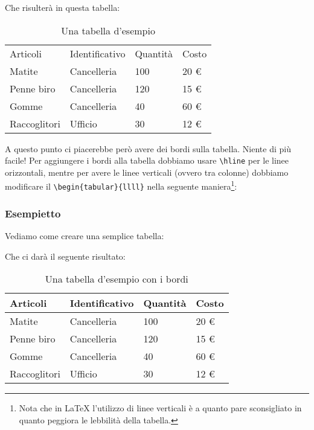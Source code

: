 Che risulterà in questa tabella:
\begin{table}[H]
\centering
\begin{tabular}{llll}
Articoli      & Identificativo & Quantità & Costo \\
Matite        & Cancelleria    & 100      & 20 \euro{}\\
Penne biro    & Cancelleria    & 120      & 15 \euro{}\\
Gomme         & Cancelleria    & 40       & 60 \euro{}\\
Raccoglitori  & Ufficio        & 30       & 12 \euro{}
\end{tabular}
\caption{Una tabella d'esempio}
\label{tabella:esempio}
\end{table}

A questo punto ci piacerebbe però avere dei bordi sulla tabella. Niente di più
facile! Per aggiungere i bordi alla tabella dobbiamo usare \verb!\hline! per le
linee orizzontali, mentre per avere le linee verticali (ovvero tra colonne)
dobbiamo modificare il \verb!\begin{tabular}{llll}! nella seguente
maniera\footnote{Nota che in \LaTeX{} l'utilizzo di linee verticali è a
quanto pare sconsigliato in quanto peggiora le lebbilità della tabella.}:

\vspace{\abovedisplayskip}
\begin{minipage}{\linewidth}
  \subsubsection{Esempietto}

  Vediamo come creare una semplice tabella:
  


\end{minipage}
\vspace{\belowdisplayskip}

Che ci darà il seguente risultato:

\begin{table}[H]
\centering
\begin{tabular}{|l|l|l|l|}
\hline
Articoli      & Identificativo & Quantità & Costo \\
\hline
Matite        & Cancelleria    & 100      & 20 \euro{}\\
\hline
Penne biro    & Cancelleria    & 120      & 15 \euro{}\\
\hline
Gomme         & Cancelleria    & 40       & 60 \euro{}\\
\hline
Raccoglitori  & Ufficio        & 30       & 12 \euro{}\\
\hline
\end{tabular}
\caption{Una tabella d'esempio con i bordi}
\label{tabella:esempio2}
\end{table}

